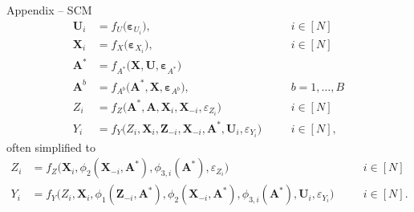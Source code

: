 \documentclass{beamer}
\def \bZ {\textbf{Z}}
\def \bA {\textbf{A}}
\def \bX {\textbf{X}}
\def \bU {\textbf{U}}
\def \beps {\boldsymbol{\varepsilon}}
\begin{document}
    \begin{frame}{Appendix -- SCM}
        \begin{equation*}
            \begin{aligned}
                \bU_i &= f_U\big(\beps_{U_i} \big), &&\quad i \in [N] \\ 
                \bX_i &= f_X\big( \beps_{X_i} \big), &&\quad i \in [N] \\
                \bA^\ast &= f_{A^\ast}\big(\bX, \bU, \beps_{A^\ast}\big) \\
                \bA^b &= f_{A^b}\big(\bA^\ast,\bX,\beps_{A^b}\big) ,&&\quad b=1,\ldots,B \\
                Z_i &= f_Z\big(\bA^\ast, \bA, \bX_i, \bX_{-i},\varepsilon_{Z_i}\big) &&\quad i\in [N] \\
                Y_i &= f_Y\big(Z_i,\bX_i, \bZ_{-i},\bX_{-i},\bA^\ast, \bU_i, \varepsilon_{Y_i} \big) &&\quad i\in [N],
            \end{aligned}
        \end{equation*}
        often simplified to
        \begin{equation*}
            \begin{aligned}
                Z_i &= f_Z\big(\bX_i, \phi_2(\bX_{-i},\bA^\ast), \phi_{3,i}(\bA^\ast),\varepsilon_{Z_i}\big) &&\quad i\in [N] \\
                Y_i &= f_Y\big(Z_i,\bX_i, \phi_1(\bZ_{-i},\bA^\ast), \phi_2(\bX_{-i},\bA^\ast),\phi_{3,i}(\bA^\ast), \bU_i, \varepsilon_{Y_i} \big) &&\quad i\in [N].
            \end{aligned}
        \end{equation*}
    \end{frame}
\end{document}
